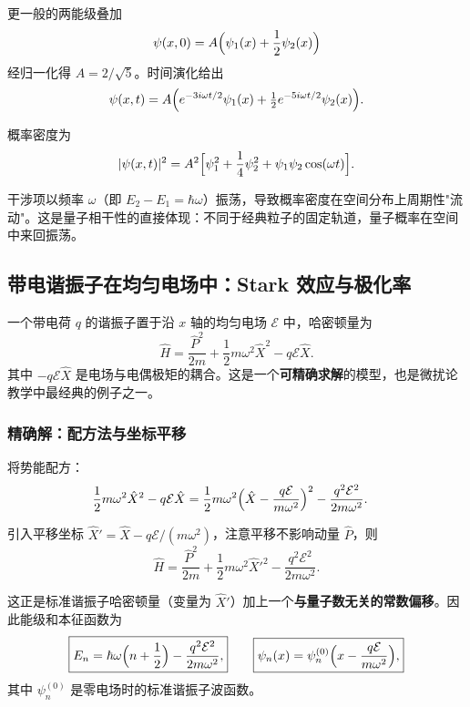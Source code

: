 更一般的两能级叠加
\[
\psi(x,0) = A\Bigl(\psi_1(x) + \frac12\psi_2(x)\Bigr)
\]
经归一化得 $A = 2/\sqrt{5}$。时间演化给出
\[
\psi(x,t) = A\Bigl(e^{-3i\omega t/2}\psi_1(x) + \tfrac12 e^{-5i\omega t/2}\psi_2(x)\Bigr).
\]

概率密度为
\begin{equation}
|\psi(x,t)|^2 = A^2\Bigl[\psi_1^2 + \frac14\psi_2^2 + \psi_1\psi_2\cos(\omega t)\Bigr].
\end{equation}

干涉项以频率 $\omega$（即 $E_2-E_1=\hbar\omega$）振荡，导致概率密度在空间分布上周期性"流动"。这是量子相干性的直接体现：不同于经典粒子的固定轨道，量子概率在空间中来回振荡。

\subsection{带电谐振子在均匀电场中：Stark 效应与极化率}

一个带电荷 $q$ 的谐振子置于沿 $x$ 轴的均匀电场 $\mathcal{E}$ 中，哈密顿量为
\begin{equation}
\hat{H} = \frac{\hat{P}^2}{2m} + \frac12 m\omega^2\hat{X}^2 - q\mathcal{E}\hat{X}.
\end{equation}
其中 $-q\mathcal{E}\hat{X}$ 是电场与电偶极矩的耦合。这是一个\textbf{可精确求解}的模型，也是微扰论教学中最经典的例子之一。

\subsubsection{精确解：配方法与坐标平移}

将势能配方：
\begin{align*}
\frac12 m\omega^2\hat{X}^2 - q\mathcal{E}\hat{X}
&= \frac12 m\omega^2\Bigl(\hat{X} - \frac{q\mathcal{E}}{m\omega^2}\Bigr)^2 - \frac{q^2\mathcal{E}^2}{2m\omega^2}.
\end{align*}

引入平移坐标 $\hat{X}' = \hat{X} - q\mathcal{E}/(m\omega^2)$，注意平移不影响动量 $\hat{P}$，则
\[
\hat{H} = \frac{\hat{P}^2}{2m} + \frac12 m\omega^2\hat{X}'^2 - \frac{q^2\mathcal{E}^2}{2m\omega^2}.
\]

这正是标准谐振子哈密顿量（变量为 $\hat{X}'$）加上一个\textbf{与量子数无关的常数偏移}。因此能级和本征函数为
\begin{equation}
\boxed{E_n = \hbar\omega\Bigl(n + \frac12\Bigr) - \frac{q^2\mathcal{E}^2}{2m\omega^2},}
\qquad
\boxed{\psi_n(x) = \psi_n^{(0)}\Bigl(x - \frac{q\mathcal{E}}{m\omega^2}\Bigr),}
\end{equation}
其中 $\psi_n^{(0)}$ 是零电场时的标准谐振子波函数。

